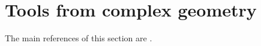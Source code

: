 \section{Tools from complex geometry}

The main references of this section are \cite{Demailly-2012-ComplexAnalyticDifferential,Dinh-Sibony-2005-IntroductionTheoryCurrents}.



